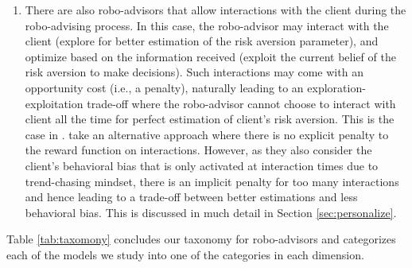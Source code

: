 \begin{enumerate}
\begin{enumerate}
        \item There are also robo-advisors that allow interactions with the client during the robo-advising process. In this case,  the robo-advisor may interact with the client (explore for better estimation of the risk aversion parameter), and optimize based on the information received (exploit the current belief of the risk aversion to make decisions). Such interactions may come with an opportunity cost (i.e., a penalty), naturally leading to an exploration-exploitation trade-off where the robo-advisor cannot choose to interact with client all the time for perfect estimation of client's risk aversion. This is the case in .  take an alternative approach where there is no explicit penalty to the reward function on interactions. However, as they also consider the client's behavioral bias that is only activated at interaction times due to trend-chasing mindset, there is an implicit penalty for too many interactions and hence leading to a trade-off between better estimations and less behavioral bias. This is discussed in much detail in Section \ref{sec:personalize}.
    \end{enumerate}
\end{enumerate}

Table \ref{tab:taxomony} concludes our taxonomy for robo-advisors and categorizes each of the models we study into one of the categories in each dimension.
